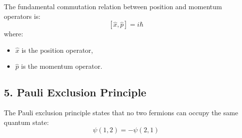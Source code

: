 \documentclass{article}
\begin{document}
The fundamental commutation relation between position and momentum operators is:
\[
[\hat{x}, \hat{p}] = i \hbar
\]
where:
\begin{itemize}
    \item \( \hat{x} \) is the position operator,
    \item \( \hat{p} \) is the momentum operator.
\end{itemize}

\subsection*{5. Pauli Exclusion Principle}

The Pauli exclusion principle states that no two fermions can occupy the same quantum state:
\[
\psi(1, 2) = -\psi(2, 1)
\]
\end{document}
